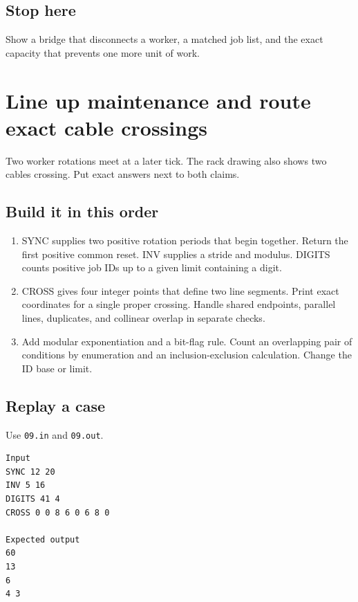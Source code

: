 \documentclass[11pt,letterpaper]{article}
\begin{document}
\subsection*{Stop here}

Show a bridge that disconnects a worker, a matched job list, and the exact capacity that prevents one more unit of work.

\clearpage

\section{Line up maintenance and route exact cable crossings}\label{datacenter:09}

Two worker rotations meet at a later tick. The rack drawing also shows two cables crossing. Put exact answers next to both claims.

\subsection*{Build it in this order}

\begin{enumerate}
\item SYNC supplies two positive rotation periods that begin together. Return the first positive common reset. INV supplies a stride and modulus. DIGITS counts positive job IDs up to a given limit containing a digit.
\item CROSS gives four integer points that define two line segments. Print exact coordinates for a single proper crossing. Handle shared endpoints, parallel lines, duplicates, and collinear overlap in separate checks.
\item Add modular exponentiation and a bit-flag rule. Count an overlapping pair of conditions by enumeration and an inclusion-exclusion calculation. Change the ID base or limit.
\end{enumerate}

\subsection*{Replay a case}

Use \texttt{09.in} and \texttt{09.out}.

\begin{samepage}
\small
\begin{verbatim}
Input
SYNC 12 20
INV 5 16
DIGITS 41 4
CROSS 0 0 8 6 0 6 8 0

Expected output
60
13
6
4 3
\end{verbatim}
\end{samepage}
\end{document}
